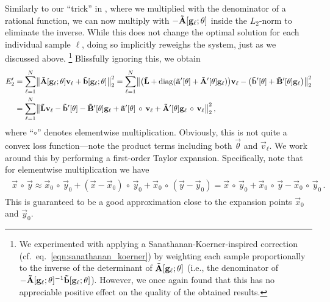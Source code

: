Similarly to our \enquote{trick} in , where we multiplied with the denominator of a rational function, we can now multiply with $-\mathbf{\tilde A}[\mathbf{g}_\ell; \mathbf{\theta}]$ inside the $L_2$-norm to eliminate the inverse.
While this does not change the optimal solution for each individual sample $\ell$, doing so implicitly  reweighs the system, just as we discussed above.%
\footnote{We experimented with applying a Sanathanan-Koerner-inspired correction (cf.~eq.~\ref{eqn:sanathanan_koerner}) by weighting each sample proportionally to the inverse of the determinant of $\mathbf{\tilde A}[\mathbf{g}_\ell; \mathbf{\theta}]$ (i.e., the denominator of $-\mathbf{\tilde A}[\mathbf{g}_\ell; \mathbf{\theta}]^{-1} \mathbf{\tilde b}[\mathbf{g}_\ell; \mathbf{\theta}]$).
However, we once again found that this has no appreciable positive effect on the quality of the obtained results.}
Blissfully ignoring this, we obtain
\begin{align*}
	E_2' &= \sum_{\ell = 1}^N \bigl\| \mathbf{\tilde A}[\mathbf{g}_\ell; \mathbf{\theta}] \mathbf{v}_\ell + \mathbf{\tilde b}[\mathbf{g}_\ell; \mathbf{\theta}] \bigr\|_2^2
	   = \sum_{\ell = 1}^N
	   \bigl\|
	   \bigl(\mathbf{\tilde L} + \operatorname{\mathrm{diag}}(\mathbf{\tilde a}'[\mathbf{\theta}] + \mathbf{\tilde A}'[\mathbf{\theta}] \mathbf{g}_\ell) \bigr) \mathbf{v}_\ell -
	  	  	        \bigl(\mathbf{\tilde b}'[\mathbf{\theta}] + \mathbf{\tilde B}'[\mathbf{\theta}] \mathbf{g}_\ell  \bigr)
	  \bigr\|_2^2 \\
	  &= \sum_{\ell = 1}^N
	  	   \bigl\|
	  	     \mathbf{\tilde L} \mathbf{v}_\ell
	  	   - \mathbf{\tilde b}'[\mathbf{\theta}] 
	  	   - \mathbf{\tilde B}'[\mathbf{\theta}] \mathbf{g}_\ell
	  	   + \mathbf{\tilde a}'[\mathbf{\theta}] \, \circ \, \mathbf{v}_\ell
	  	   + \mathbf{\tilde A}'[\mathbf{\theta}] \mathbf{g}_\ell \, \circ \, \mathbf{v}_\ell
 	  \bigr\|_2^2 \,,
\end{align*}
where \enquote{$\circ$} denotes elementwise multiplication.
Obviously, this is not quite a convex loss function---note the product terms including both $\vec \theta$ and $\vec v_\ell$. We work around this by performing a first-order Taylor expansion.
Specifically, note that for elementwise multiplication we have
\begin{align}
	\begin{aligned}
	\vec x \, \circ \, \vec y
	\approx \vec x_0 \, \circ \, \vec y_0 + (\vec x - \vec x_0) \, \circ \, \vec y_0 + \vec x_0 \, \circ \, (\vec y - \vec y_0)
	= \vec x \, \circ \, \vec y_0 + \vec x_0 \, \circ \, \vec y - \vec x_0 \, \circ \, \vec y_0 \,.
	\end{aligned}
	\label{eqn:nlif_e21}
\end{align}
This is guaranteed to be a good approximation close to the expansion points $\vec x_0$ and $\vec y_0$.

\pagebreak

